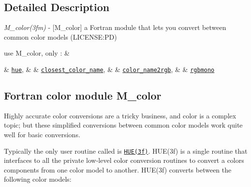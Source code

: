 \subsection{Detailed Description}

\begin{DoxyDescription}
\item[\label{_M_COLOR}%
N\+A\+ME ]

{\itshape M\+\_\+color(3fm)} -\/ \mbox{[}M\+\_\+color\mbox{]} a Fortran module that lets you convert between common color models (L\+I\+C\+E\+N\+SE\+:PD) 


\item[S\+Y\+N\+O\+P\+S\+IS ]
\begin{DoxyPre}\end{DoxyPre}



\begin{DoxyPre}    use M\_color, only : \&\end{DoxyPre}



\begin{DoxyPre}       \& \href{hue.3m_color.html}{\tt hue}, \&
       \& \href{closest_color_name.3m_color.html}{\tt closest\_color\_name}, \&
       \& \href{color_name2rgb.3m_color.html}{\tt color\_name2rgb}, \&
       \& \href{rgbmono.3m_color.html}{\tt rgbmono}
 \end{DoxyPre}
 


\item[D\+E\+S\+C\+R\+I\+P\+T\+I\+ON ]

\subsection*{Fortran color module M\+\_\+color}





Highly accurate color conversions are a tricky business, and color is a complex topic; but these simplified conversions between common color models work quite well for basic conversions. 





Typically the only user routine called is \href{hue.3m_color.html}{\tt H\+U\+E(3f)}. H\+U\+E(3f) is a single routine that interfaces to all the private low-\/level color conversion routines to convert a color\textquotesingle{}s components from one color model to another. H\+U\+E(3f) converts between the following color models\+: 





\end{DoxyDescription}
